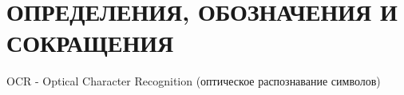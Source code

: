 \section*{ОПРЕДЕЛЕНИЯ, ОБОЗНАЧЕНИЯ И СОКРАЩЕНИЯ}
OCR - Optical Character Recognition (оптическое распознавание символов)
\pagebreak